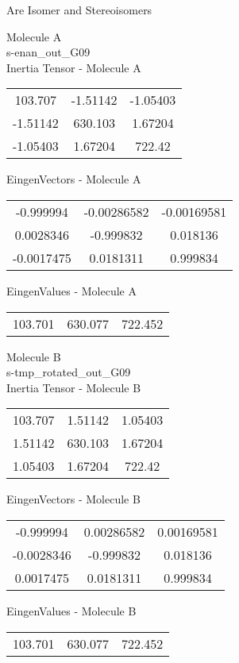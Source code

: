 \begin{center}
\vtab
\vtab
\textcolor{NavyBlue}{\Large Are Isomer and Stereoisomers}
\end{center}
\newpage
\begin{multicols}{2}
\begin{center}
Molecule A \\ 
s-enan\_out\_G09
\\
Inertia Tensor - Molecule A \\
\vtab
\begin{tabular}{|c c c|}
103.707	 & 	-1.51142	 & 	-1.05403	 \\
-1.51142	 & 	630.103	 & 	1.67204	 \\
-1.05403	 & 	1.67204	 & 	722.42
\end{tabular}

\vtab
 EingenVectors - Molecule A     \\
\vtab
\begin{tabular}{|c c c|}
-0.999994	 & 	-0.00286582	 & 	-0.00169581	 \\
0.0028346	 & 	-0.999832	 & 	0.018136	 \\
-0.0017475	 & 	0.0181311	 & 	0.999834
\end{tabular}

\vtab
 EingenValues - Molecule A     \\
\vtab
\begin{tabular}{|c c c|}
103.701	 & 	630.077	 & 	722.452
\end{tabular}
\columnbreak

Molecule B \\ 
s-tmp\_rotated\_out\_G09
\\
Inertia Tensor - Molecule B \\
\vtab
\begin{tabular}{|c c c|}
103.707	 & 	1.51142	 & 	1.05403	 \\
1.51142	 & 	630.103	 & 	1.67204	 \\
1.05403	 & 	1.67204	 & 	722.42
\end{tabular}

\vtab
 EingenVectors - Molecule B     \\
\vtab
\begin{tabular}{|c c c|}
-0.999994	 & 	0.00286582	 & 	0.00169581	 \\
-0.0028346	 & 	-0.999832	 & 	0.018136	 \\
0.0017475	 & 	0.0181311	 & 	0.999834
\end{tabular}

\vtab
 EingenValues - Molecule B     \\
\vtab
\begin{tabular}{|c c c|}
103.701	 & 	630.077	 & 	722.452
\end{tabular}

\end{center}
\end{multicols}

